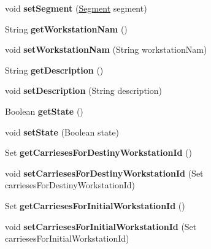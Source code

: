 \begin{DoxyCompactItemize}
void {\bfseries set\+Segment} (\mbox{\hyperlink{classentity_1_1copy_1_1_segment}{Segment}} segment)
\item 
\mbox{\label{classentity_1_1copy_1_1_workstation_aed94d2ada3c15744e8a80d722493bdea}} 
String {\bfseries get\+Workstation\+Nam} ()
\item 
\mbox{\label{classentity_1_1copy_1_1_workstation_ae8325bcb478ba2b217283e36a0fc7040}} 
void {\bfseries set\+Workstation\+Nam} (String workstation\+Nam)
\item 
\mbox{\label{classentity_1_1copy_1_1_workstation_adf871ad7a5cc25a555a3fe52d9352515}} 
String {\bfseries get\+Description} ()
\item 
\mbox{\label{classentity_1_1copy_1_1_workstation_a6eb07774bbfade50adc81f5114a0ea75}} 
void {\bfseries set\+Description} (String description)
\item 
\mbox{\label{classentity_1_1copy_1_1_workstation_a006351c895b27595c477034925351f5b}} 
Boolean {\bfseries get\+State} ()
\item 
\mbox{\label{classentity_1_1copy_1_1_workstation_a2d393d110a694567d3615b004562da77}} 
void {\bfseries set\+State} (Boolean state)
\item 
\mbox{\label{classentity_1_1copy_1_1_workstation_a03bc877808e7e887f4c797f0b65f3c9b}} 
Set {\bfseries get\+Carrieses\+For\+Destiny\+Workstation\+Id} ()
\item 
\mbox{\label{classentity_1_1copy_1_1_workstation_ac81c43d28440e0f47ca840728a207ce3}} 
void {\bfseries set\+Carrieses\+For\+Destiny\+Workstation\+Id} (Set carrieses\+For\+Destiny\+Workstation\+Id)
\item 
\mbox{\label{classentity_1_1copy_1_1_workstation_ae47801761c012db3977af32352f860a4}} 
Set {\bfseries get\+Carrieses\+For\+Initial\+Workstation\+Id} ()
\item 
\mbox{\label{classentity_1_1copy_1_1_workstation_abecb65e6c6e1eae6692d81ebb5acfd93}} 
void {\bfseries set\+Carrieses\+For\+Initial\+Workstation\+Id} (Set carrieses\+For\+Initial\+Workstation\+Id)
\end{DoxyCompactItemize}


